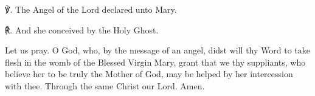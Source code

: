 \begin{enpars}


℣. The Angel of the Lord declared unto Mary.

℟. And she conceived by the Holy Ghost.

Let us pray. 
O God, who, by the message of an angel, didst will thy Word to take flesh in the womb of the Blessed Virgin Mary, grant that we thy suppliants, who believe her to be truly the Mother of God, may be helped by her intercession with thee. Through the same Christ our Lord. Amen. \end{enpars}